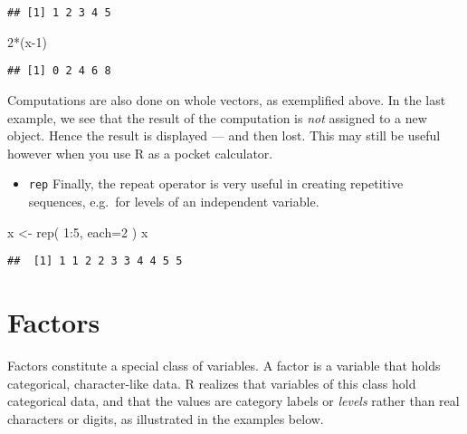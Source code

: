 \documentclass[
]{book}
\newenvironment{Shaded}{\begin{snugshade}}{\end{snugshade}}
\newcommand{\AttributeTok}[1]{\textcolor[rgb]{0.77,0.63,0.00}{#1}}
\newcommand{\DecValTok}[1]{\textcolor[rgb]{0.00,0.00,0.81}{#1}}
\newcommand{\FunctionTok}[1]{\textcolor[rgb]{0.00,0.00,0.00}{#1}}
\newcommand{\NormalTok}[1]{#1}
\newcommand{\OtherTok}[1]{\textcolor[rgb]{0.56,0.35,0.01}{#1}}
\newcommand{\SpecialCharTok}[1]{\textcolor[rgb]{0.00,0.00,0.00}{#1}}
\providecommand{\tightlist}{%
  \setlength{\itemsep}{0pt}\setlength{\parskip}{0pt}}
\begin{document}
\begin{verbatim}
## [1] 1 2 3 4 5
\end{verbatim}

\begin{Shaded}
\begin{Highlighting}[]
\DecValTok{2}\SpecialCharTok{*}\NormalTok{(x}\DecValTok{{-}1}\NormalTok{)}
\end{Highlighting}
\end{Shaded}

\begin{verbatim}
## [1] 0 2 4 6 8
\end{verbatim}

Computations are also done on whole vectors, as exemplified above.
In the last example, we see that the result of the computation is
\emph{not} assigned to a new object. Hence the result is displayed ---
and then lost. This may still be useful however when you use
R as a pocket calculator.

\begin{itemize}
\tightlist
\item
  \texttt{rep} Finally, the repeat operator is very useful in creating repetitive
  sequences, e.g.~for levels of an independent variable.
\end{itemize}

\begin{Shaded}
\begin{Highlighting}[]
\NormalTok{x }\OtherTok{\textless{}{-}} \FunctionTok{rep}\NormalTok{( }\DecValTok{1}\SpecialCharTok{:}\DecValTok{5}\NormalTok{, }\AttributeTok{each=}\DecValTok{2}\NormalTok{ )}
\NormalTok{x}
\end{Highlighting}
\end{Shaded}

\begin{verbatim}
##  [1] 1 1 2 2 3 3 4 4 5 5
\end{verbatim}

\hypertarget{sec:factors}{%
\section{Factors}\label{sec:factors}}

Factors constitute a special class of variables. A factor is a variable
that holds categorical, character-like data. R realizes
that variables of this class hold categorical data, and that the values
are category labels or \emph{levels} rather than real characters or digits,
as illustrated in the examples below.
\end{document}
